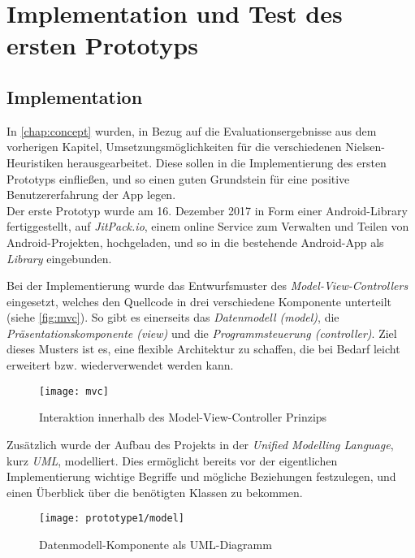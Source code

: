 \section{Implementation und Test des ersten Prototyps}\label{sec:pro1}

\subsection{Implementation}
In \autoref{chap:concept} wurden, in Bezug auf die Evaluationsergebnisse aus dem vorherigen Kapitel, Umsetzungsmöglichkeiten für die verschiedenen Nielsen-Heuristiken herausgearbeitet.
Diese sollen in die Implementierung des ersten Prototyps einfließen, und so einen guten Grundstein für eine positive Benutzererfahrung der App legen. \\

Der erste Prototyp wurde am 16. Dezember 2017 in Form einer Android-Library fertiggestellt, auf \emph{JitPack.io}, einem online Service zum Verwalten und Teilen von Android-Projekten, hochgeladen, und so in die bestehende Android-App als \emph{Library} eingebunden. \\

Bei der Implementierung wurde das Entwurfsmuster des \emph{Model-View-Controllers} eingesetzt, welches den Quellcode in drei verschiedene Komponente unterteilt (siehe \autoref{fig:mvc}).
So gibt es einerseits das \emph{Datenmodell (model)}, die \emph{Präsentationskomponente (view)} und die \emph{Programmsteuerung (controller)}.
Ziel dieses Musters ist es, eine flexible Architektur zu schaffen, die bei Bedarf leicht erweitert bzw. wiederverwendet werden kann.

\begin{figure}[h]
  \centering
  \texttt{[image: mvc]}
  \caption{Interaktion innerhalb des Model-View-Controller Prinzips}
  \label{fig:mvc}
\end{figure}

\noindent
Zusätzlich wurde der Aufbau des Projekts in der \emph{Unified Modelling Language}, kurz \emph{UML}, modelliert.
Dies ermöglicht bereits vor der eigentlichen Implementierung wichtige Begriffe und mögliche Beziehungen festzulegen, und einen Überblick über die benötigten Klassen zu bekommen.

\begin{figure}[h]
  \centering
  \texttt{[image: prototype1/model]}
  \caption{Datenmodell-Komponente als UML-Diagramm}
  \label{fig:model1}
\end{figure}

